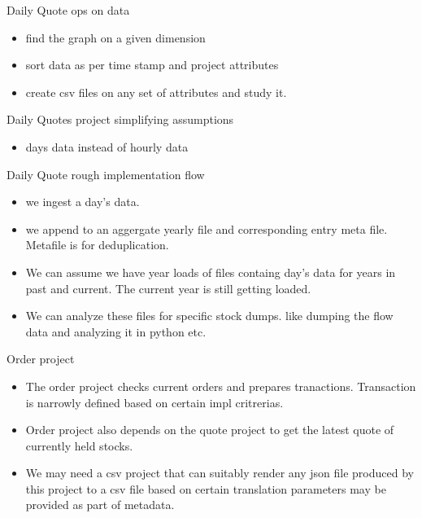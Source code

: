 \documentclass{beamer}
\begin{document}
\begin{frame}{Daily Quote ops on data}

	\begin{itemize}
		\item find the graph on a given dimension
		\item sort data as per time stamp and project attributes 
		\item create csv files on any set of attributes and study it.
	\end{itemize}
\end{frame}


\begin{frame}{Daily Quotes project simplifying assumptions}
	\begin{itemize}
		\item days data instead of hourly data
	
	\end{itemize}
\end{frame}

\begin{frame}{Daily Quote rough implementation flow}
	\begin{itemize}
		\item we ingest a day's data.
		\item we append to an aggergate yearly file and corresponding entry meta file. Metafile is for deduplication.
		\item We can assume we have year loads of files containg day's data for years in past and current. The current year is still getting loaded.

		\item We can analyze these files for specific stock dumps. like dumping the flow data and analyzing it in python etc.
	\end{itemize}
\end{frame}


\begin{frame}{Order project}
	\begin{itemize}
		\item The order project checks current orders and prepares tranactions. Transaction is narrowly defined based on certain impl critrerias.
		\item Order project also depends on the quote project to get the latest quote of currently held stocks.
		\item We may need a csv project that can suitably render any json file produced by this project to a csv file based on  certain translation parameters may be provided as part of metadata.
		
	\end{itemize}
\end{frame}
\end{document}
